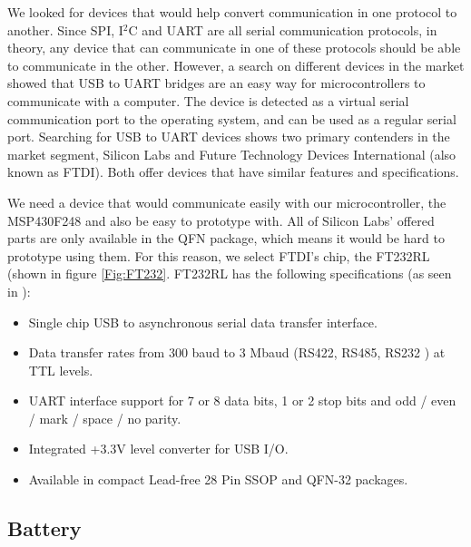 We looked for devices that would help convert communication in one protocol to another. Since SPI, I$^2$C and UART are all serial communication protocols, in theory, any device that can communicate in one of these protocols should be able to communicate in the other. However, a search on different devices in the market showed that USB to UART bridges are an easy way for microcontrollers to communicate with a computer. The device is detected as a virtual serial communication port to the operating system, and can be used as a regular serial port. Searching for USB to UART devices shows two primary contenders in the market segment, Silicon Labs and Future Technology Devices International (also known as FTDI). Both offer devices that have similar features and specifications. 

We need a device that would communicate easily with our microcontroller, the MSP430F248 and also be easy to prototype with. All of Silicon Labs' offered parts are only available in the QFN package, which means it would be hard to prototype using them. For this reason, we select FTDI's chip, the FT232RL (shown in figure \ref{Fig:FT232}. FT232RL has the following specifications (as seen in \cite{FT232Datasheet}):

\begin{itemize}
	\item Single chip USB to asynchronous serial data transfer interface.
	\item Data transfer rates from 300 baud to 3 Mbaud (RS422, RS485, RS232 ) at TTL levels.
	\item UART interface support for 7 or 8 data bits, 1 or 2 stop bits and odd / even / mark / space / no parity.
	\item Integrated +3.3V level converter for USB I/O.
	\item Available in compact Lead-free 28 Pin SSOP and QFN-32 packages.
\end{itemize}


\subsection{Battery}
\label{Sec:Battery}

